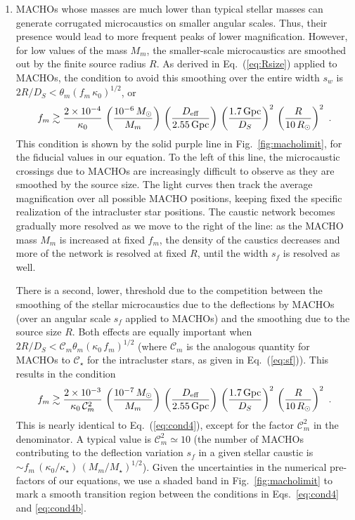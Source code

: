 \documentclass{aastex6}
\newcommand{\refeq}[1]{Eq.~(\ref{eq:#1})}
\newcommand{\reffig}[1]{Fig.~\ref{fig:#1}}
\newcommand{\ba}{\begin{eqnarray}}
\newcommand{\ea}{\end{eqnarray}}
\begin{document}
\begin{enumerate}
\item MACHOs whose masses are much lower than typical stellar masses can generate corrugated microcaustics on smaller angular scales. Thus, their presence would lead to more frequent peaks of lower magnification. However, for low values of the mass $M_m$, the smaller-scale microcaustics are smoothed out by the finite source radius $R$. As derived in \refeq{Rsize} applied to MACHOs, the condition to avoid this smoothing over the entire width $s_w$ is $2R/D_S < \theta_m (f_m \,\kappa_0)^{1/2}$, or
\ba
\label{eq:cond4}
 f_m \gtrsim \frac{2\times 10^{-4}}{\kappa_0}\,
 \left( \frac{10^{-6}\,M_\odot}{M_m} \right)\, 
 \left( \frac{D_{\rm eff}}{2.55\,{\rm Gpc}} \right)\,
\left( \frac{1.7\,{\rm Gpc}}{D_S} \right)^2\,
\left( \frac{R}{10\,R_\odot} \right)^2 ~.
\ea
This condition is shown by the solid purple line in
\reffig{macholimit},
for the fiducial values in our equation. To the left of this line, the microcaustic crossings due to MACHOs are increasingly difficult to observe as they are smoothed by the source size. The light curves then track the average magnification over all possible MACHO positions, keeping fixed the specific realization of the intracluster star positions. The caustic network becomes gradually more resolved as we move to the right of the line: as the MACHO mass $M_m$ is increased at fixed $f_m$, the density of the caustics decreases and more of the network is resolved at fixed $R$, until the width $s_f$ is resolved as well.

There is a second, lower, threshold due to the competition between the smoothing of the stellar microcaustics due to the deflections by MACHOs (over an angular scale $s_f$ applied to MACHOs) and the smoothing due to the source size $R$. Both effects are equally important when $2R/D_S < \mathcal{C}_m \theta_m (\kappa_0\, f_m)^{1/2}$ (where $\mathcal{C}_m$ is the analogous quantity for MACHOs to $\mathcal{C}_\star$ for the intracluster stars, as given in \refeq{sf}). This results in the condition
\ba
\label{eq:cond4b}
 f_m \gtrsim \frac{2\times 10^{-3}}{\kappa_0 \, \mathcal{C}_m^2}\,
\left( \frac{10^{-7}\,M_\odot}{M_m} \right)\,
\left( \frac{D_{\rm eff}}{2.55\,{\rm Gpc}} \right)\,
\left( \frac{1.7\,{\rm Gpc}}{D_S} \right)^2\,
\left( \frac{R}{10\,R_\odot} \right)^2 ~.
\ea
This is nearly identical to \refeq{cond4}, except for the
factor $\mathcal{C}_m^2$ in the denominator. A typical value is $\mathcal{C}_m^2 \simeq 10$
(the number of MACHOs contributing to the deflection variation $s_f$ in
a given stellar caustic is
$\sim f_m\,(\kappa_0/\kappa_\star)\, (M_m/M_\star)^{1/2}$). Given the uncertainties in the numerical pre-factors of our equations, we use a shaded band in \reffig{macholimit} to mark a smooth transition region between the conditions in Eqs.~\eqref{eq:cond4} and \eqref{eq:cond4b}.
\end{enumerate}
\end{document}
